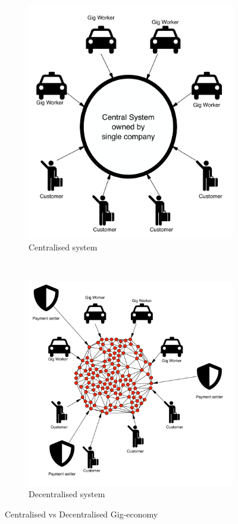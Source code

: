 \documentclass{article}
\begin{document}
\begin{figure}[t!]
    \centering
    \begin{subfigure}[t]{0.4\textwidth}
        \centering
        \includegraphics[scale=0.25]{centralised.pdf}
        \caption{Centralised system}
    \end{subfigure}%
    ~ 
    \begin{subfigure}[t]{0.4\textwidth}
        \centering
        \includegraphics[scale=0.25]{decentralised.pdf}
        \caption{Decentralised system}
    \end{subfigure}
    \caption{Centralised vs Decentralised Gig-economy}
	\label{fig:decent}	
\end{figure}
\end{document}
